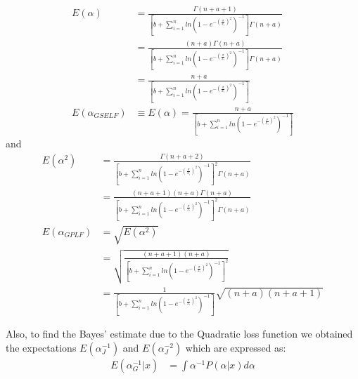 \documentclass[a4paper,12pt]{report}
\begin{document}
\begin{equation}\label{3.67}
\begin{split}
E(\alpha)&=\frac{\Gamma(n+a+1)}{\left[b+\sum\limits_{ i=1 }^{n}ln\left(1-e^{-\left(\frac{\sigma}{x_i}\right)^2}\right)^{-1}\right]\Gamma(n+a)}\\
&=\frac{(n+a)\Gamma(n+a)}{\left[b+\sum\limits_{ i=1 }^{n}ln\left(1-e^{-\left(\frac{\sigma}{x_i}\right)^2}\right)^{-1}\right]\Gamma(n+a)}\\
&=\frac{n+a}{\left[b+\sum\limits_{ i=1 }^{n}ln\left(1-e^{-\left(\frac{\sigma}{x_i}\right)^2}\right)^{-1}\right]}\\
E(\alpha_{GSELF})&\equiv E(\alpha) =\frac{n+a}{\left[b+\sum\limits_{ i=1 }^{n}ln\left(1-e^{-\left(\frac{\sigma}{x_i}\right)^2}\right)^{-1}\right]}
\end{split} 
\end{equation}
and 
\begin{equation}\label{pst}
\begin{split}
E(\alpha^2)&=\frac{\Gamma(n+a+2)}{\left[b+\sum\limits_{ i=1 }^{n}ln\left(1-e^{-\left(\frac{\sigma}{x_i}\right)^2}\right)^{-1}\right]^2\Gamma(n+a)}\\
&=\frac{(n+a+1)(n+a)\Gamma(n+a)}{\left[b+\sum\limits_{ i=1 }^{n}ln\left(1-e^{-\left(\frac{\sigma}{x_i}\right)^2}\right)^{-1}\right]^2\Gamma(n+a)}\\
E(\alpha_{GPLF})&=\sqrt{E(\alpha^2)}\\
&=\sqrt{\frac{(n+a+1)(n+a)}{\left[b+\sum\limits_{ i=1 }^{n}ln\left(1-e^{-\left(\frac{\sigma}{x_i}\right)^2}\right)^{-1}\right]^2}}\\
&=\frac{1}{\left[b+\sum\limits_{ i=1 }^{n}ln\left(1-e^{-\left(\frac{\sigma}{x_i}\right)^2}\right)^{-1}\right]}\sqrt{(n+a)(n+a+1)}
\end{split}
\end{equation}

Also, to find the Bayes' estimate due to the Quadratic loss function we obtained the expectations $E(\alpha_J^{-1})$ and $E(\alpha_J^{-2})$ which are expressed as: \\
\[\begin{split}
E(\alpha_G^{-1}|x)&=\int \alpha^{-1}P(\alpha|x)d\alpha\\
\end{split}\]
\end{document}

